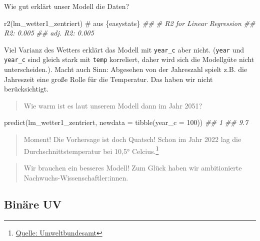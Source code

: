 \documentclass[
  a4paper,
]{scrbook}
\newenvironment{Shaded}{\begin{snugshade}}{\end{snugshade}}
\newcommand{\AttributeTok}[1]{\textcolor[rgb]{0.40,0.45,0.13}{#1}}
\newcommand{\CommentTok}[1]{\textcolor[rgb]{0.37,0.37,0.37}{#1}}
\newcommand{\DecValTok}[1]{\textcolor[rgb]{0.68,0.00,0.00}{#1}}
\newcommand{\DocumentationTok}[1]{\textcolor[rgb]{0.37,0.37,0.37}{\textit{#1}}}
\newcommand{\FunctionTok}[1]{\textcolor[rgb]{0.28,0.35,0.67}{#1}}
\newcommand{\NormalTok}[1]{\textcolor[rgb]{0.00,0.23,0.31}{#1}}
\theoremstyle{definition}
\theoremstyle{definition}
\theoremstyle{definition}
\theoremstyle{remark}
\begin{document}
Wie gut erklärt unser Modell die Daten?

\begin{Shaded}
\begin{Highlighting}[]
\FunctionTok{r2}\NormalTok{(lm\_wetter1\_zentriert)  }\CommentTok{\# aus \textasciigrave{}\{easystats\}\textasciigrave{}}
\DocumentationTok{\#\# \# R2 for Linear Regression}
\DocumentationTok{\#\#        R2: 0.005}
\DocumentationTok{\#\#   adj. R2: 0.005}
\end{Highlighting}
\end{Shaded}

Viel Varianz des Wetters erklärt das Modell mit \texttt{year\_c} aber
nicht. (\texttt{year} und \texttt{year\_c} sind gleich stark mit
\texttt{temp} korreliert, daher wird sich die Modellgüte nicht
unterscheiden.). Macht auch Sinn: Abgesehen von der Jahreszahl spielt
z.B. die Jahreszeit eine große Rolle für die Temperatur. Das haben wir
nicht berücksichtigt.

\begin{quote}
{} Wie warm ist es laut unserem Modell dann im Jahr 2051?
\end{quote}

\begin{Shaded}
\begin{Highlighting}[]
\FunctionTok{predict}\NormalTok{(lm\_wetter1\_zentriert, }\AttributeTok{newdata =} \FunctionTok{tibble}\NormalTok{(}\AttributeTok{year\_c =} \DecValTok{100}\NormalTok{))}
\DocumentationTok{\#\#   1 }
\DocumentationTok{\#\# 9.7}
\end{Highlighting}
\end{Shaded}

\begin{quote}
{} Moment! Die Vorhersage ist doch Quatsch! Schon im Jahr
2022 lag die Durchschnittstemperatur bei 10,5° Celcius.\footnote{\href{https://www.umweltbundesamt.de/daten/klima/trends-der-lufttemperatur\#steigende-durchschnittstemperaturen-weltweit}{Quelle:
  Umweltbundesamt}}
\end{quote}

\begin{quote}
{} Wir brauchen ein besseres Modell! Zum Glück haben wir
ambitionierte Nachwuchs-Wissenschaftler:innen.
\end{quote}

\subsection{Binäre UV}\label{binuxe4re-uv}
\end{document}
